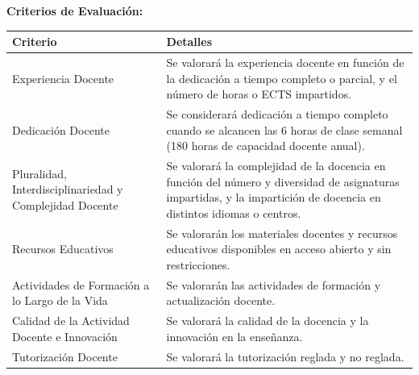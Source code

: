 \documentclass{article}
\begin{document}
\begin{itemize}
\begin{itemize}
                        \textbf{Criterios de Evaluación:}
                        \vspace{0.4cm}
                        \begin{table}[h!]\centering\renewcommand{\arraystretch}{1.3}
                              \begin{tabular}{|p{}|p{}|}\hline
                                    Criterio                                                & Detalles                                                                                                                                                             \\\hline
                                    Experiencia Docente                                     & Se valorará la experiencia docente en función de la dedicación a tiempo completo o parcial, y el número de horas o ECTS impartidos.                                  \\\hline
                                    Dedicación Docente                                      & Se considerará dedicación a tiempo completo cuando se alcancen las 6 horas de clase semanal (180 horas de capacidad docente anual).                                  \\\hline
                                    Pluralidad, Interdisciplinariedad y Complejidad Docente & Se valorará la complejidad de la docencia en función del número y diversidad de asignaturas impartidas, y la impartición de docencia en distintos idiomas o centros. \\\hline
                                    Recursos Educativos                                     & Se valorarán los materiales docentes y recursos educativos disponibles en acceso abierto y sin restricciones.                                                        \\\hline
                                    Actividades de Formación a lo Largo de la Vida          & Se valorarán las actividades de formación y actualización docente.                                                                                                   \\\hline
                                    Calidad de la Actividad Docente e Innovación            & Se valorará la calidad de la docencia y la innovación en la enseñanza.                                                                                               \\\hline
                                    Tutorización Docente                                    & Se valorará la tutorización reglada y no reglada.                                                                                                                    \\\hline
                              \end{tabular}\end{table}
                        \vspace{0.4cm}


\end{itemize}
\end{itemize}
\end{document}
